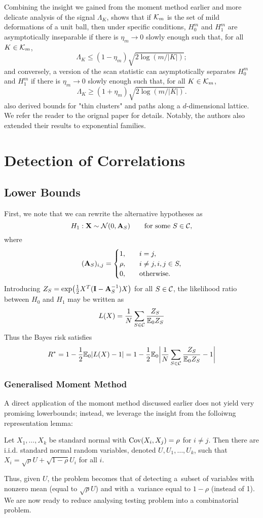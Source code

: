 \documentclass[10pt, oneside]{article}
\begin{document}
Combining the insight we gained from the moment method earlier and more delicate analysis of the signal $\Lambda_K$, \cite{arias2011detection} shows that if ${\mathcal K}_m$ is the set of mild deformations of a unit ball, then under specific conditions,
$H_0^m$ and $H_1^m$ are asymptotically inseparable if there is
$\eta_m \to0$ slowly enough such that, for all $K \in{\mathcal K}_m$,
%
\[
\Lambda_K \leq(1 - \eta_m) \sqrt{2 \log(m/|K|)};
\]
%
and conversely, a version of the scan statistic can asymptotically separates $H_0^m$ and $H_1^m$ if there is $\eta_m
\to0$ slowly enough such that, for all $K \in{\mathcal K}_m$,
%
\[
\Lambda_K \geq(1 + \eta_m) \sqrt{2 \log(m/|K|)}.
\]
\cite{arias2011detection} also derived bounds for "thin clusters" and paths along a $d$-dimensional lattice. We refer the reader to the orignal paper for details. Notably, the authors also extended their results to exponential families.

\section{Detection of Correlations}
\subsection{Lower Bounds}
First, we note that we can rewrite the alternative hypotheses as $$H_1: \mathbf{X} \sim{\mathcal N}(0,\mathbf{A}_S)\qquad\mbox{for some $S \in{\mathcal C}$,}$$ where
$$(\mathbf{A}_S)_{i,j} = \begin{cases}
1, &\quad i = j, \cr
\rho, &\quad i \neq j, i, j \in S, \cr
0, &\quad \text{otherwise}.
\end{cases}$$
Introducing $Z_S = \exp\bigl(\tfrac{1}{2} X^T (\mathbf{I}- \mathbf{A}_S^{-1}) X \bigr)$ for all $S \in{\mathcal C}$, the likelihood ratio between $H_0$ and $H_1$ may be written as $$L(X) = \frac{1}{N} \sum_{S \in{\mathcal C}} \frac{Z_S}{\mathbb{E}_0 Z_S}$$ Thus the Bayes risk satisfies
$$R^* = 1 - \frac{1}{2} \mathbb{E}_0 |L(X) - 1| = 1 - \frac{1}{2} \mathbb{E}_0\biggl| \frac{1}{N} \sum_{S \in{\mathcal C}} \frac{Z_S}{\mathbb{E}_0 Z_S} - 1\biggr|$$

\subsubsection{Generalised Moment Method}
A direct application of the momont method discussed earlier does not yield very promising lowerbounds; instead, we leverage the insight from the folloiwng representation lemma:
\begin{lem}
  \label{lemrepresent}
  Let $X_1,\ldots, X_k$ be standard normal with $\operatorname{Cov}(X_i, X_j) = \rho
  $ for $i \neq j$. Then there are i.i.d. standard normal random
  variables, denoted $U, U_1,\ldots, U_k$, such that $X_i = \sqrt{\rho}
  U + \sqrt{1-\rho}   U_i$ for all $i$.
\end{lem}
Thus, given $U$, the problem becomes that of detecting a~subset of
variables with nonzero mean (equal to $\sqrt{\rho} U$) and with a~variance equal to $1-\rho$ (instead of 1). We are now ready to reduce analysing testing problem into a combinatorial problem.
\end{document}
